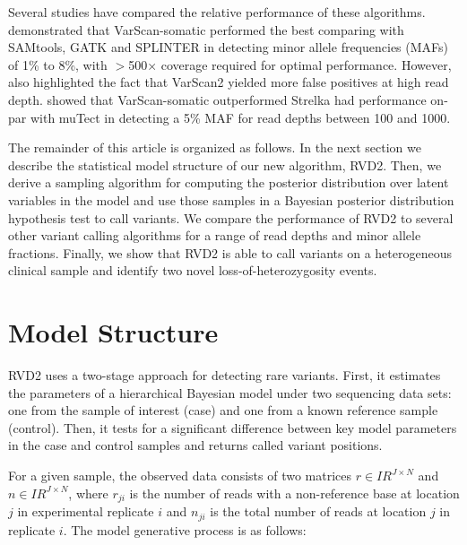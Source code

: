 \documentclass{bioinfo}
\newcommand{\RR}{I\!\!R} %
\begin{document}
Several studies have compared the relative performance of these algorithms. \citet{spencer2013performance} demonstrated  that VarScan-somatic performed the best comparing with SAMtools, GATK and SPLINTER in detecting minor allele frequencies (MAFs) of 1\% to 8\%, with $ > $500× coverage required for optimal performance. However, \citet{spencer2013performance} also highlighted the fact that VarScan2 yielded more false positives at high read depth. \citet{Stead:2013fu} showed that VarScan-somatic outperformed Strelka had performance on-par with muTect in detecting a 5\% MAF for read depths between 100 and 1000. %

The remainder of this article is organized as follows. In the next section we describe the statistical model structure of our new algorithm, RVD2. Then, we derive a sampling algorithm for computing the posterior distribution over latent variables in the model and use those samples in a Bayesian posterior distribution hypothesis test to call variants. We compare the performance of RVD2 to several other variant calling algorithms for a range of read depths and minor allele fractions. Finally, we show that RVD2 is able to call variants on a heterogeneous clinical sample and identify two novel loss-of-heterozygosity events. 


\section{Model Structure}\label{sec:model_structure}

RVD2 uses a two-stage approach for detecting rare variants. First, it estimates the parameters of a hierarchical Bayesian model under two sequencing data sets: one from the sample of interest (case) and one from a known reference sample (control). Then, it tests for a significant difference between key model parameters in the case and control samples and returns called variant positions.

For a given sample, the observed data consists of two matrices $r \in \RR^{J \times N}$ and $n \in \RR^{J \times N}$, where $r_{ji}$ is the number of reads with a non-reference base at location $j$ in experimental replicate $i$ and $n_{ji}$ is the total number of reads at location $j$ in replicate $i$. The model generative process is as follows:
\end{document}
